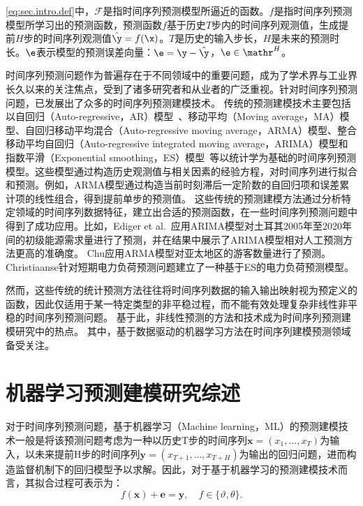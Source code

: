 \autoref{eq:sec.intro.def}中，$\mathcal{F}$是指时间序列预测模型所逼近的函数。\(f\)是指时间序列预测模型所学习出的预测函数，预测函数\(f\)基于历史$T$步内的时间序列观测值，生成提前$H$步的时间序列观测值\(\hat{\y} = f(\x)\)。$T$是历史的输入步长，$H$是未来的预测时长。\(\e\)表示模型的预测误差向量：\( \e = \y - \hat{\y} \)，\(\e \in \mathr^{H}\)。

时间序列预测问题作为普遍存在于不同领域中的重要问题，成为了学术界与工业界长久以来的关注焦点，受到了诸多研究者和从业者的广泛重视。针对时间序列预测问题，已发展出了众多的时间序列预测建模技术。
传统的预测建模技术主要包括以自回归（Auto-regressive，AR）模型~\cite{boxTime2011}、移动平均（Moving average，MA）模型\cite{gershenfeldFuture1993}、自回归移动平均混合（Auto-regressive moving average，ARMA）模型\cite{chuForecasting2009}、整合移动平均自回归（Auto-regressive integrated moving average，ARIMA）模型\cite{floresEvolutive2012}和指数平滑（Exponential smoothing，ES）模型~\cite{gardnerjrExponential1985,gardnerExponential2006}等以统计学为基础的时间序列预测模型。这些模型通过构造历史观测值与相关因素的经验方程，对时间序列进行拟合和预测。例如，ARMA模型通过构造当前时刻滞后一定阶数的自回归项和误差累计项的线性组合，得到提前单步的预测值。
这些传统的预测建模方法通过分析特定领域的时间序列数据特征，建立出合适的预测函数，在一些时间序列预测问题中得到了成功应用。比如，Ediger et al.~\cite{edigerARIMA2007}应用ARIMA模型对土耳其2005年至2020年间的初级能源需求量进行了预测，并在结果中展示了ARIMA模型相对人工预测方法更高的准确度。
Chu\cite{chuForecasting2009}应用ARMA模型对亚太地区的游客数量进行了预测。
Christiaanse\cite{christiaanseShortTerm1971}针对短期电力负荷预测问题建立了一种基于ES的电力负荷预测模型。

然而，这些传统的统计预测方法往往将时间序列数据的输入输出映射视为预定义的函数，因此仅适用于某一特定类型的非平稳过程，而不能有效处理复杂非线性非平稳的时间序列预测问题\cite{boxTime2011}。
基于此，非线性预测的方法和技术成为时间序列预测建模研究中的热点。
其中，基于数据驱动的机器学习方法在时间序列建模预测领域备受关注。


\section{机器学习预测建模研究综述\label{sec:ch.intro.ml}}
对于时间序列预测问题，基于机器学习（Machine learning，ML）的预测建模技术一般是将该预测问题考虑为一种以历史T步的时间序列$\bm{x} = (x_1, \ldots, x_T)$为输入，以未来提前H步的时间序列$\bm{y} = (x_{T+1},\ldots,x_{T+H})$为输出的回归问题，进而构造监督机制下的回归模型予以求解。因此，对于基于机器学习的预测建模技术而言，其拟合过程可表示为：
\begin{equation}
    f(\bm x) + \bm e = \bm y, \quad f \in \{\vartheta, \theta\}\label{eq:sec.intro.ml}.
\end{equation}

